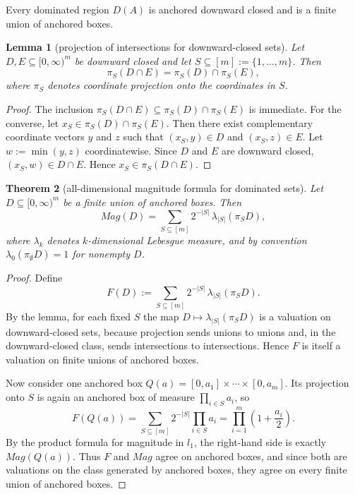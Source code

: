 \documentclass{article}
\def\ell{l}%
\def\Mag{Mag}%
\newtheorem{theorem}{Theorem}[section]
\newtheorem{lemma}[theorem]{Lemma}
\theoremstyle{definition}
\newcommand{\Mag}{\operatorname{Mag}}
\newcommand{\1}{\mathbf{1}}
\newcommand{\proj}{\pi}
\begin{document}
Every dominated region $D(A)$ is anchored downward closed and is a finite union of anchored boxes.

\begin{lemma}[projection of intersections for downward-closed sets]
Let $D,E\subseteq [0,\infty)^m$ be downward closed and let $S\subseteq [m]:=\{1,\dots,m\}$. Then
\[
\proj_S(D\cap E)=\proj_S(D)\cap \proj_S(E),
\]
where $\proj_S$ denotes coordinate projection onto the coordinates in $S$.
\end{lemma}

\begin{proof}
The inclusion $\proj_S(D\cap E)\subseteq \proj_S(D)\cap \proj_S(E)$ is immediate. For the converse, let $x_S\in \proj_S(D)\cap \proj_S(E)$. Then there exist complementary coordinate vectors $y$ and $z$ such that $(x_S,y)\in D$ and $(x_S,z)\in E$. Let $w:=\min(y,z)$ coordinatewise. Since $D$ and $E$ are downward closed, $(x_S,w)\in D\cap E$. Hence $x_S\in \proj_S(D\cap E)$.
\end{proof}

\begin{theorem}[all-dimensional magnitude formula for dominated sets]
Let $D\subseteq [0,\infty)^m$ be a finite union of anchored boxes. Then
\[
\Mag(D)=\sum_{S\subseteq [m]} 2^{-|S|}\,\lambda_{|S|}(\proj_S D),
\]
where $\lambda_k$ denotes $k$-dimensional Lebesgue measure, and by convention $\lambda_0(\proj_\emptyset D)=1$ for nonempty $D$.
\end{theorem}

\begin{proof}
Define
\[
F(D):=\sum_{S\subseteq [m]} 2^{-|S|}\,\lambda_{|S|}(\proj_S D).
\]
By the lemma, for each fixed $S$ the map $D\mapsto \lambda_{|S|}(\proj_S D)$ is a valuation on downward-closed sets, because projection sends unions to unions and, in the downward-closed class, sends intersections to intersections. Hence $F$ is itself a valuation on finite unions of anchored boxes.

Now consider one anchored box $Q(a)=[0,a_1]\times\cdots\times[0,a_m]$. Its projection onto $S$ is again an anchored box of measure $\prod_{i\in S} a_i$, so
\[
F(Q(a))=\sum_{S\subseteq [m]} 2^{-|S|}\prod_{i\in S} a_i
=\prod_{i=1}^m \left(1+\frac{a_i}{2}\right).
\]
By the product formula for magnitude in $\ell_1$, the right-hand side is exactly $\Mag(Q(a))$. Thus $F$ and $\Mag$ agree on anchored boxes, and since both are valuations on the class generated by anchored boxes, they agree on every finite union of anchored boxes.
\end{proof}
\end{document}
